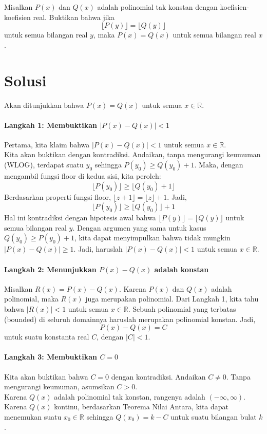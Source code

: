 \begin{problem}[HMMT 2017]
Misalkan $P(x)$ dan $Q(x)$ adalah polinomial tak konstan dengan koefisien-koefisien real. Buktikan bahwa jika
\[ \lfloor P(y) \rfloor = \lfloor Q(y) \rfloor \]
untuk semua bilangan real $y$, maka $P(x) = Q(x)$ untuk semua bilangan real $x$.
\end{problem}

\section*{Solusi}
\noindent
Akan ditunjukkan bahwa $P(x)=Q(x)$ untuk semua $x \in \mathbb{R}$.

\paragraph{Langkah 1: Membuktikan $|P(x) - Q(x)| < 1$}
Pertama, kita klaim bahwa $|P(x) - Q(x)| < 1$ untuk semua $x \in \mathbb{R}$. \\
Kita akan buktikan dengan kontradiksi. Andaikan, tanpa mengurangi keumuman (WLOG), terdapat suatu $y_0$ sehingga $P(y_0) \ge Q(y_0) + 1$. Maka, dengan mengambil fungsi floor di kedua sisi, kita peroleh:
\[ \lfloor P(y_0) \rfloor \ge \lfloor Q(y_0) + 1 \rfloor \]
Berdasarkan properti fungsi floor, $\lfloor z+1 \rfloor = \lfloor z \rfloor + 1$. Jadi,
\[ \lfloor P(y_0) \rfloor \ge \lfloor Q(y_0) \rfloor + 1 \]
Hal ini kontradiksi dengan hipotesis awal bahwa $\lfloor P(y) \rfloor = \lfloor Q(y) \rfloor$ untuk semua bilangan real $y$. Dengan argumen yang sama untuk kasus $Q(y_0) \ge P(y_0) + 1$, kita dapat menyimpulkan bahwa tidak mungkin $|P(x) - Q(x)| \ge 1$. Jadi, haruslah $|P(x) - Q(x)| < 1$ untuk semua $x \in \mathbb{R}$.

\paragraph{Langkah 2: Menunjukkan $P(x)-Q(x)$ adalah konstan}
Misalkan $R(x) = P(x) - Q(x)$. Karena $P(x)$ dan $Q(x)$ adalah polinomial, maka $R(x)$ juga merupakan polinomial. Dari Langkah 1, kita tahu bahwa $|R(x)| < 1$ untuk semua $x \in \mathbb{R}$. Sebuah polinomial yang terbatas (bounded) di seluruh domainnya haruslah merupakan polinomial konstan. Jadi,
\[ P(x) - Q(x) = C \]
untuk suatu konstanta real $C$, dengan $|C| < 1$.

\paragraph{Langkah 3: Membuktikan $C=0$}
Kita akan buktikan bahwa $C=0$ dengan kontradiksi. Andaikan $C \neq 0$. Tanpa mengurangi keumuman, asumsikan $C>0$. \\
Karena $Q(x)$ adalah polinomial tak konstan, rangenya adalah $(-\infty, \infty)$. Karena $Q(x)$ kontinu, berdasarkan Teorema Nilai Antara, kita dapat menemukan suatu $x_0 \in \mathbb{R}$ sehingga $Q(x_0) = k - C$ untuk suatu bilangan bulat $k$.

